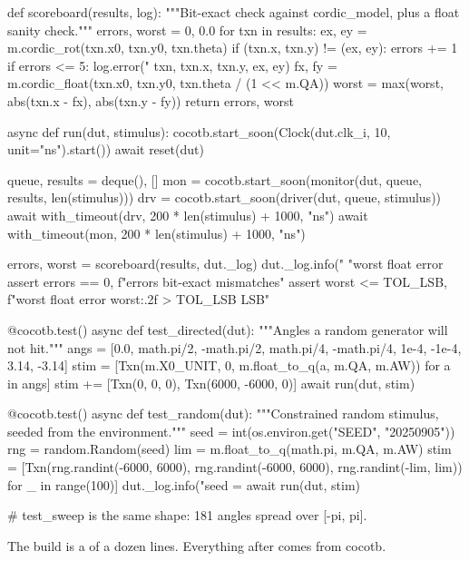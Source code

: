 \begin{pycode}[caption={A complete cocotb testbench for \code{cordic\_rot}
(\file{test\_cordic.py}).},label={lst:python:cocotbtb}]
def scoreboard(results, log):
    """Bit-exact check against cordic_model, plus a float sanity check."""
    errors, worst = 0, 0.0
    for txn in results:
        ex, ey = m.cordic_rot(txn.x0, txn.y0, txn.theta)
        if (txn.x, txn.y) != (ex, ey):
            errors += 1
            if errors <= 5:
                log.error("%
                          txn, txn.x, txn.y, ex, ey)
        fx, fy = m.cordic_float(txn.x0, txn.y0, txn.theta / (1 << m.QA))
        worst = max(worst, abs(txn.x - fx), abs(txn.y - fy))
    return errors, worst


async def run(dut, stimulus):
    cocotb.start_soon(Clock(dut.clk_i, 10, unit="ns").start())
    await reset(dut)

    queue, results = deque(), []
    mon = cocotb.start_soon(monitor(dut, queue, results, len(stimulus)))
    drv = cocotb.start_soon(driver(dut, queue, stimulus))
    await with_timeout(drv, 200 * len(stimulus) + 1000, "ns")
    await with_timeout(mon, 200 * len(stimulus) + 1000, "ns")

    errors, worst = scoreboard(results, dut._log)
    dut._log.info("%
                  "worst float error %
    assert errors == 0, f"{errors} bit-exact mismatches"
    assert worst <= TOL_LSB, f"worst float error {worst:.2f} > {TOL_LSB} LSB"


@cocotb.test()
async def test_directed(dut):
    """Angles a random generator will not hit."""
    angs = [0.0, math.pi/2, -math.pi/2, math.pi/4, -math.pi/4,
            1e-4, -1e-4, 3.14, -3.14]
    stim = [Txn(m.X0_UNIT, 0, m.float_to_q(a, m.QA, m.AW)) for a in angs]
    stim += [Txn(0, 0, 0), Txn(6000, -6000, 0)]
    await run(dut, stim)


@cocotb.test()
async def test_random(dut):
    """Constrained random stimulus, seeded from the environment."""
    seed = int(os.environ.get("SEED", "20250905"))
    rng = random.Random(seed)
    lim = m.float_to_q(math.pi, m.QA, m.AW)
    stim = [Txn(rng.randint(-6000, 6000), rng.randint(-6000, 6000),
                rng.randint(-lim, lim)) for _ in range(100)]
    dut._log.info("seed = %
    await run(dut, stim)


# test_sweep is the same shape: 181 angles spread over [-pi, pi].
\end{pycode}

The build is a  of a dozen lines. Everything after
 comes from cocotb.

